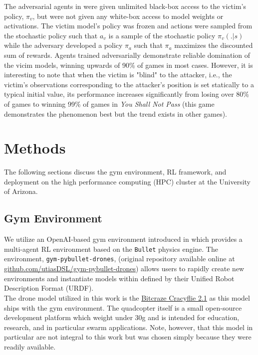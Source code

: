 \documentclass{article}
\begin{document}
\noindent 
The adversarial agents in \cite{Gleave2019} were given unlimited black-box access to the victim's policy, $\pi_v$, but were not given any white-box access to model weights or activations. 
The victim model's policy was frozen and actions were sampled from the stochastic policy such that $a_v$ is a sample of the stochastic policy $\pi_v(. | s)$ while the adversary developed a policy $\pi_a$ such that $\pi_a$ maximizes the discounted sum of rewards. 
Agents trained adversarially demonstrate reliable domination of the vicim models, winning upwards of 90\% of games in most cases. 
However, it is interesting to note that when the victim is "blind" to the attacker, i.e., the victim's observations corresponding to the attacker's position is set statically to a typical initial value, its performance increases significantly from losing over 80\% of games to winning 99\% of games in \textit{You Shall Not Pass} (this game demonstrates the phenomenon best but the trend exists in other games). 

\section{Methods}\label{sec:methods}
The following sections discuss the gym environment, RL framework, and deployment on the high performance computing (HPC) cluster at the University of Arizona.

\subsection{Gym Environment}\label{subsec:gym_env}
We utilize an OpenAI-based gym environment introduced in \cite{Panerati2021} which provides a multi-agent RL environment based on the \texttt{Bullet} physics engine. 
The environment, \texttt{gym-pybullet-drones}, (original repository available online at \url{github.com/utiasDSL/gym-pybullet-drones}) allows users to rapidly create new environments and instantiate models within defined by their Unified Robot Description Format (URDF). \\

\noindent
The drone model utilized in this work is the \href{https://www.bitcraze.io/documentation/hardware/crazyflie_2_1/crazyflie_2_1-datasheet.pdf}{Bitcraze Cracyflie 2.1} as this model ships with the gym environment. 
The quadcopter itself is a small open-source development platform which weight under 30g and is intended for education, research, and in particular swarm applications. 
Note, however, that this model in particular are not integral to this work but was chosen simply because they were readily available.
\end{document}
